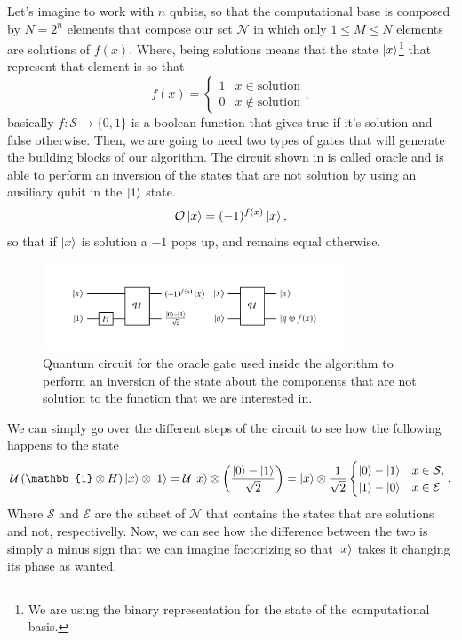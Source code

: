 Let's imagine to work with $n$ qubits, so that the computational base is composed by $N = 2^n$ elements that compose our set $\mathcal{N}$ in which only $1 \le M \le N$ elements are solutions of $f(x)$. Where, being solutions means that the state $\ket{x}$\footnote{We are using the binary representation for the state of the computational basis.} that represent that element is so that
\begin{equation}
    f(x) = \begin{cases}
        1 & x \in \text{solution}\\
        0 & x \notin \text{solution}
    \end{cases},
\end{equation}
basically $f: \mathcal{S} \to \{0, 1\}$ is a boolean function that gives true if it's solution and false otherwise. Then, we are going to need two types of gates that will generate the building blocks of our algorithm.
{
    The circuit shown in  is called oracle and is able to perform an inversion of the states that are not solution by using an ausiliary qubit in the $\ket{1}$ state.
    \begin{equation}
        \mathcal{O}\ket{x} = (-1)^{f(x)}\ket{x},
    \end{equation}
    so that if $\ket{x}$ is solution a $-1$ pops up, and remains equal otherwise.
}
\begin{figure}[t]
    \centering
    \includegraphics[width=0.8\textwidth]{Immagini/Oracle.pdf}
    \caption
    {
        Quantum circuit for the oracle gate used inside the algorithm to perform an inversion of the state about the components that are not solution to the function that we are interested in.
    }
    \label{fig:oracle}
\end{figure}
{
    We can simply go over the different steps of the circuit to see how the following happens to the state
    \begin{equation}
        \mathcal{U}\left( \mathbb{1}\otimes H \right)\ket{x}\otimes\ket{1} = \mathcal{U}\ket{x}\otimes\left( \frac{\ket{0} - \ket{1}}{\sqrt{2}} \right) = \ket{x}\otimes\frac{1}{\sqrt{2}}\begin{cases}
            \ket{0} - \ket{1} & x \in \mathcal{S},\\
            \ket{1} - \ket{0} & x \in \mathcal{E}
        \end{cases}.
    \end{equation}
    Where $\mathcal{S}$ and $\mathcal{E}$ are the subset of $\mathcal{N}$ that contains the states that are solutions and not, respectivelly. Now, we can see how the difference between the two is simply a minus sign that we can imagine factorizing so that $\ket{x}$ takes it changing its phase as wanted.
}
